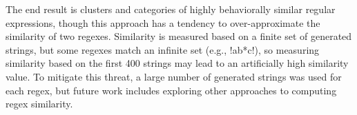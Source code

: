 The end result is clusters and categories of highly behaviorally similar regular expressions, though this approach has a tendency to over-approximate the similarity of two regexes. Similarity is measured based on a finite set of generated strings, but some regexes match an infinite set (e.g., \cverb!ab*c!), so measuring similarity based on the first 400 strings may lead to an artificially high similarity value. To mitigate this threat, a large number of generated strings was used for each regex, but future work includes exploring other approaches to computing regex similarity.
